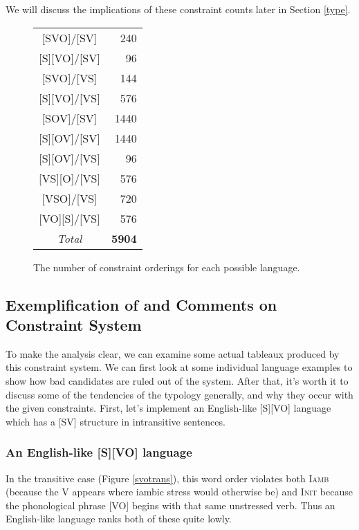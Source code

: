 \documentclass{article}
\newcommand{\iamb}{\textsc{Iamb}}
\newcommand{\initphi}{\textsc{Init\textphi}}
\begin{document}
We will discuss the implications of these constraint counts later in Section \ref{type}.

\begin{figure}
	\centering
	\begin{tabular}{cr}
		{}[SVO]/[SV] & 240\\
		{}[S][VO]/[SV] & 96\\
		{}[SVO]/[VS] & 144\\
		{}[S][VO]/[VS] & 576\\
		{}[SOV]/[SV] & 1440\\
		{}[S][OV]/[SV] & 1440\\
		{}[S][OV]/[VS] & 96\\
		{}[VS][O]/[VS] & 576\\
		{}[VSO]/[VS] & 720\\
		{}[VO][S]/[VS] & 576\\\hline
		\emph{Total} & \textbf{5904}\\
	\end{tabular}
	\caption{The number of constraint orderings for each possible language.\label{connum}}
\end{figure}


\subsection{Exemplification of and Comments on Constraint System}

To make the analysis clear, we can examine some actual tableaux produced by this constraint system.
We can first look at some individual language examples to show how bad candidates are ruled out of the system.
After that, it's worth it to discuss some of the tendencies of the typology generally, and why they occur with the given constraints.
First, let's implement an English-like [S][VO] language which has a [SV] structure in intransitive sentences.

\subsubsection{An English-like [S][VO] language}

In the transitive case (Figure \ref{svotrans}), this word order violates both {\iamb} (because the V appears where iambic stress would otherwise be) and {\initphi} because the phonological phrase [VO] begins with that same unstressed verb.
Thus an English-like language ranks both of these quite lowly.
\end{document}

